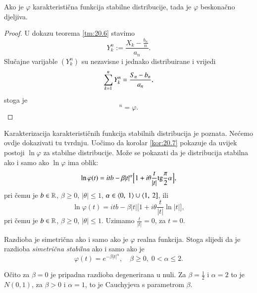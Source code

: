 \begin{kor} \label{kor:20.7}
    Ako je $\varphi$ karakteristi\v cna funkcija stabilne distribucije, tada je $\varphi$ beskona\v cno djeljiva.
\end{kor}

\begin{proof}
    U dokazu teorema \ref{tm:20.6} stavimo
    \begin{equation*}
        Y_k^n := \frac{X_k - \frac{b_n}{n}}{a_n}.
    \end{equation*}
    Slu\v cajne varijable $(Y_k^n)$ su nezavisne i jednako distribuirane i vrijedi
    \begin{equation*}
        \sum\limits_{k = 1}^{n} Y_k^n = \frac{S_n - b_n}{a_n},
    \end{equation*}
    stoga je
    \begin{equation*}
        [ \varphi_{Y_1^n} ]^n = \varphi.
    \end{equation*}
\end{proof}

\begin{nap} \label{nap:20.8}
    Karakterizacija karakteristi\v cnih funkcija stabilnih distribucija je poznata.
    Ne\' cemo ovdje dokazivati tu tvrdnju.
    Uo\v cimo da korolar \ref{kor:20.7} pokazuje da uvijek postoji $\ln \varphi$ za stabilne distribucije.
    Mo\v ze se pokazati da je distribucija stabilna ako i samo ako $\ln \varphi$ ima oblik:
    \begin{equation}    \label{jed:20.9}
        \ln \varphi (t) = itb - \beta |t|^\alpha \Big[ 1 + i \theta \frac{t}{|t|} \mathrm{tg} \frac{\pi}{2} \alpha \Big],
    \end{equation}
    pri \v cemu je $b \in \mathbb{R}$, $\beta \geq 0$, $|\theta| \leq 1$, $\alpha \in \langle {0}, \: {1} \rangle \cup \langle {1}, \: {2}]$, ili
    \begin{equation}    \label{jed:20.10}
        \ln \varphi (t) = i t b - \beta |t| \Big[ 1 + i \theta \frac{t}{|t|} \ln |t| \Big],
    \end{equation}
    pri \v cemu je $b \in \mathbb{R}$, $\beta \geq 0$, $|\theta| \leq 1$.
    Uzimamo $\frac{t}{|t|} = 0$, za $t = 0$.

    Razdioba je simetri\v cna ako i samo ako je $\varphi$ realna funkcija.
    Stoga slijedi da je razdioba \emph{simetri\v cna stabilna} ako i samo ako je
    \begin{equation}    \label{jed:20.11}
        \varphi (t) = e^{-\beta |t|^\alpha}, \quad \beta \geq 0, \; 0 < \alpha \leq 2.
    \end{equation}

    O\v cito za $\beta = 0$ je pripadna razdioba degenerirana u nuli.
    Za $\beta = \frac{1}{2}$ i $\alpha = 2$ to je $N(0,1)$, za $\beta > 0$ i $\alpha = 1$, to je Cauchyjeva s parametrom $\beta$.
\end{nap}


